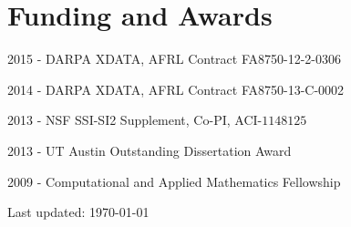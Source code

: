 \documentclass[letterpaper]{article}
\def\footerlink{}
\renewenvironment{itemize}{
  \begin{list}{}{
    \setlength{\leftmargin}{1.5em}
  }
}{
  \end{list}
}
\begin{document}

\section*{Funding and Awards}
\begin{itemize}
\item 2015 - DARPA XDATA, AFRL Contract FA8750-12-2-0306
\item 2014 - DARPA XDATA, AFRL Contract FA8750-13-C-0002
\item 2013 - NSF SSI-SI2 Supplement, Co-PI, ACI-$1148125$
\item 2013 - UT Austin Outstanding Dissertation Award
\item 2009 - Computational and Applied Mathematics Fellowship
\end{itemize}


\bigskip

\begin{center}
  \begin{footnotesize}
    Last updated: \today \\
    \href{\footerlink}{\texttt{\footerlink}}
  \end{footnotesize}
\end{center}
\end{document}
